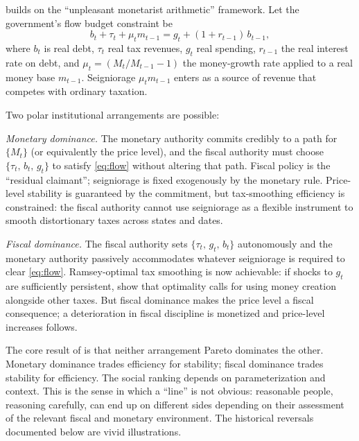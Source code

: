 \documentclass[12pt]{article}
\begin{document}
\citet{Sargent2011} builds on the \citet{SargentWallace1981}
``unpleasant monetarist arithmetic'' framework.  Let the government's
flow budget constraint be
\begin{equation}
\label{eq:flow}
b_t + \tau_t + \mu_t m_{t-1} = g_t + (1+r_{t-1})\,b_{t-1},
\end{equation}
where $b_t$ is real debt, $\tau_t$ real tax revenues, $g_t$ real spending,
$r_{t-1}$ the real interest rate on debt, and $\mu_t = (M_t/M_{t-1}-1)$
the money-growth rate applied to a real money base $m_{t-1}$.  Seigniorage
$\mu_t m_{t-1}$ enters as a source of revenue that competes with ordinary
taxation.

Two polar institutional arrangements are possible:

\textit{Monetary dominance.}  The monetary authority commits credibly to
a path for $\{M_t\}$ (or equivalently the price level), and the fiscal
authority must choose $\{\tau_t,\, b_t,\, g_t\}$ to satisfy
\eqref{eq:flow} without altering that path.  Fiscal policy is the
``residual claimant''; seigniorage is fixed exogenously by the monetary
rule.  Price-level stability is guaranteed by the commitment, but
tax-smoothing efficiency is constrained: the fiscal authority cannot use
seigniorage as a flexible instrument to smooth distortionary taxes across
states and dates.

\textit{Fiscal dominance.}  The fiscal authority sets
$\{\tau_t,\, g_t,\, b_t\}$ autonomously and the monetary authority
passively accommodates whatever seigniorage is required to clear
\eqref{eq:flow}.  Ramsey-optimal tax smoothing is now achievable:
if shocks to $g_t$ are sufficiently persistent, \citet{LucasStokey1983}
show that optimality calls for using money creation alongside other taxes.
But fiscal dominance makes the price level a fiscal consequence; a
deterioration in fiscal discipline is monetized and price-level
increases  follows.

The core result of \citet{Sargent2011} is that neither arrangement Pareto
dominates the other.  Monetary dominance trades efficiency for stability;
fiscal dominance trades stability for efficiency.  The social ranking
depends on parameterization and context.  This is the sense in which a
``line'' is not obvious: reasonable people, reasoning carefully, can end
up on different sides depending on their assessment of the relevant
fiscal and monetary environment.  The historical reversals documented
below are vivid illustrations.


\end{document}
